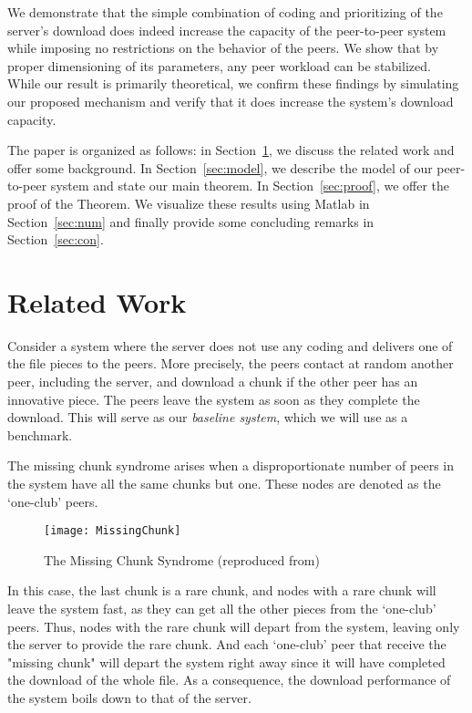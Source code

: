 \documentclass[11pt,conference]{IEEEtran}
\begin{document}
We demonstrate that the simple combination of coding and prioritizing of the server's download does indeed increase the capacity of the peer-to-peer system while imposing no restrictions on the behavior of the peers. We show that by proper dimensioning of its parameters, any peer workload can be stabilized. While our result is primarily theoretical, we confirm these findings by simulating our proposed mechanism and verify that it does increase the system's download capacity.

The paper is organized as follows: in Section~\ref{sec:rel}, we discuss the related work and offer some background. In Section~\ref{sec:model}, we describe the model of our peer-to-peer system and state our main theorem. In Section~\ref{sec:proof}, we offer the proof of the Theorem. We visualize these results using Matlab in Section~\ref{sec:num} and finally provide some concluding remarks in Section~\ref{sec:con}.

\section{Related Work}
\label{sec:rel}

Consider a system where the server does not use any coding and delivers one of the  file pieces to the peers. More precisely, the peers contact at random another peer, including the server, and download a chunk if the other peer has an innovative piece. The peers leave the system as soon as they complete the download. This will serve as our {\em baseline system}, which we will use as a benchmark.

The missing chunk syndrome\cite{Hajek2010Missing}\cite{Mathieu2006Missing} arises when a disproportionate number of peers in the system have all the same chunks but one. These nodes are denoted as the `one-club' peers.

\begin{figure}[!t]
\centering
\texttt{[image: MissingChunk]}
\caption{The Missing Chunk Syndrome (reproduced from\cite{Mathieu2006Missing})}
\label{fig:missing}
\end{figure}

In this case, the last chunk is a rare chunk, and nodes with a rare chunk will leave the system fast, as they can get all the other pieces from the `one-club' peers. Thus, nodes with the rare chunk will depart from the system, leaving only the server to provide the rare chunk. And each `one-club' peer that receive the "missing chunk" will depart the system right away since it will have completed the download of the whole file. As a consequence, the download performance of the system boils down to that of the server.
\end{document}
